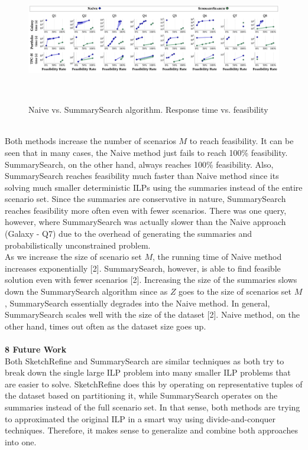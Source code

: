 \documentclass[a4paper,12pt]{article}
\begin{document}
\begin{figure}[h]
\includegraphics[scale=.4,left]{13.png}
\caption{Naive vs. SummarySearch algorithm. Response time vs. feasibility}
\
\end{figure}
\\
Both methods increase the number of scenarios $M$ to reach feasibility. It can be seen that in many cases, the Naive method just fails to reach 100\% feasibility. SummarySearch, on the other hand, always reaches 100\% feasibility. Also, SummarySearch reaches feasibility much faster than Naive method since its solving much smaller deterministic ILPs using the summaries instead of the entire scenario set. Since the summaries are conservative in nature, SummarySearch reaches feasibility more often even with fewer scenarios. There was one query, however, where SummarySearch was actually slower than the Naive approach (Galaxy - Q7) due to the overhead of generating the summaries and probabilistically unconstrained problem.
\\

As we increase the size of scenario set $M$, the running time of Naive method increases exponentially [2]. SummarySearch, however, is able to find feasible solution even with fewer scenarios [2]. Increasing the size of the summaries slows down the SummarySearch algorithm since as $Z$ goes to the size of scenarios set $M$, SummarySearch essentially degrades into the Naive method. In general, SummarySearch scales well with the size of the dataset [2]. Naive method, on the other hand, times out often as the dataset size goes up. 
\\\\

\textbf{8 Future Work}
\\

Both SketchRefine and SummarySearch are similar techniques as both try to break down the single large ILP problem into many smaller ILP problems that are easier to solve. SketchRefine does this by operating on representative tuples of the dataset based on partitioning it, while SummarySearch operates on the summaries instead of the full scenario set. In that sense, both methods are trying to approximated the original ILP in a smart way using divide-and-conquer techniques. Therefore, it makes sense to generalize and combine both approaches into one. 
\\
\end{document}
